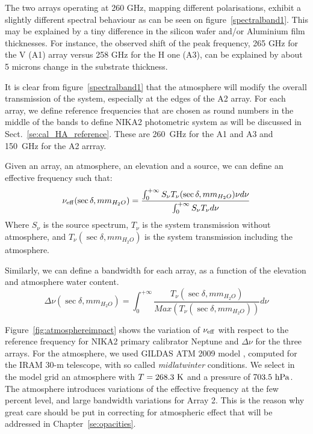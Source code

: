 The two arrays operating at 260 GHz, mapping different polarisations,
exhibit a slightly different spectral behaviour as can be
seen on figure~\ref{spectralband1}. This may be explained by a tiny
difference in the silicon wafer and/or Aluminium film thicknesses. For
instance, the observed shift of the peak frequency, 265 GHz for the V
(A1) array versus 258 GHz for the H one (A3), can be explained by
about 5 microns change in the substrate thickness. 

It is clear from figure~\ref{spectralband1} that the atmosphere will
modify the overall transmission of the system, especially at the edges
of the A2 array. For each array, we define reference frequencies that are chosen
as round numbers in the middle of the bands to define NIKA2
photometric system as will be discussed in
Sect.~\ref{se:cal_HA_reference}. These are 260~GHz for the A1 and A3 and
150~GHz for the A2 arrray.

Given an array, an atmosphere, an elevation and a source, we can
define an effective frequency such that:
\begin{equation}
\nu_{\rm{eff}}( \sec \delta, mm_{H_{2}O}) = \frac{ \int_{0}^{+\infty} S_{\nu}
  T_{\nu}(\sec \delta, mm_{H_{2}O}) \nu d\nu } { \int_{0}^{+\infty} S_{\nu} T_{\nu} d\nu}
\label{eq:nueff0}
\end{equation}
Where $S_{\nu}$ is the source spectrum, $T_{\nu}$ is the system
transmission without atmosphere, and $T_{\nu}(\sec \delta,
mm_{H_{2}O})$ is the system transmission including the atmosphere.

Similarly, we can define a bandwidth for each array, as a function of
the elevation and atmosphere water content.
\begin{equation}
\Delta\nu ( \sec \delta, mm_{H_{2}O}) = \int_{0}^{+\infty} \frac{T_{\nu}( \sec \delta, mm_{H_{2}O})}{Max(T_{\nu}( \sec \delta, mm_{H_{2}O}))}d\nu
\end{equation}

Figure~\ref{fig:atmosphereimpact} shows the variation of $\nu_{\rm{eff}}$
with respect to the reference frequency for NIKA2 primary calibrator Neptune and $\Delta\nu$ for the three
arrays. For the atmosphere, we used GILDAS ATM 2009 model \cite{ATM}, computed for
the IRAM 30-m telescope, with so called {\it midlatwinter} conditions. We select in the model
grid an atmosphere with $T=268.3 \ {\rm K}$ and a pressure of $703.5 \
{\rm hPa}$. The atmosphere introduces variations of the effective
frequency at the few percent level, and large bandwidth variations for
Array 2. This is the reason why great care should be put in
correcting for atmospheric effect that will be addressed in Chapter~\ref{se:opacities}.



